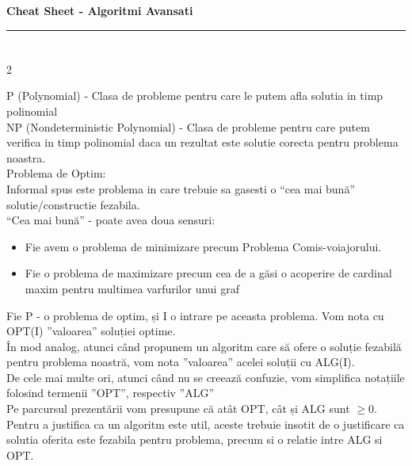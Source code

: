 \documentclass[a4paper]{article}
\newenvironment{definition}[1]
    {\par\noindent\begin{tcolorbox}[colback=blue!5!white,colframe=blue!75!black,title=#1,fonttitle=\bfseries,boxsep=1mm,left=1mm,right=1mm,top=1mm,bottom=1mm]}
    {\end{tcolorbox}}
\begin{document}
\noindent
\textbf{\tiny Cheat Sheet - Algoritmi Avansati}
\hrule
\vspace{0.25ex}

\pagestyle{empty}
\footnotesize


\section{}

\begin{multicols}{2}

P (Polynomial) - Clasa de probleme pentru care le putem afla solutia in timp polinomial \\
NP (Nondeterministic Polynomial) - Clasa de probleme pentru care putem verifica in timp polinomial daca un rezultat este solutie corecta pentru problema noastra. \\
Problema de Optim: \\
Informal spus este problema in care trebuie sa gasesti o “cea mai bună” solutie/constructie fezabila. \\
“Cea mai bună” - poate avea doua sensuri:   \\
\begin{itemize}
\item Fie avem o problema de minimizare precum Problema Comis-voiajorului. \\
\item Fie o problema de maximizare precum cea de a găsi o acoperire de cardinal maxim pentru multimea varfurilor unui graf \\
\end{itemize}
Fie P - o problema de optim, și I o intrare pe aceasta problema. Vom nota cu OPT(I) ”valoarea” soluției optime. \\
În mod analog, atunci când propunem un algoritm care să ofere o soluție fezabilă pentru problema
noastră, vom nota ”valoarea” acelei soluții cu ALG(I). \\
De cele mai multe ori, atunci când nu se creează confuzie, vom simplifica notațiile folosind termenii
”OPT”, respectiv ”ALG” \\
Pe parcursul prezentării vom presupune că atât OPT, cât și ALG sunt $\geq0$. \\
Pentru a justifica ca un algoritm este util, aceste trebuie insotit de o justificare
ca solutia oferita este fezabila pentru problema, precum si o relatie intre ALG si OPT.

\end{multicols}
\end{document}
